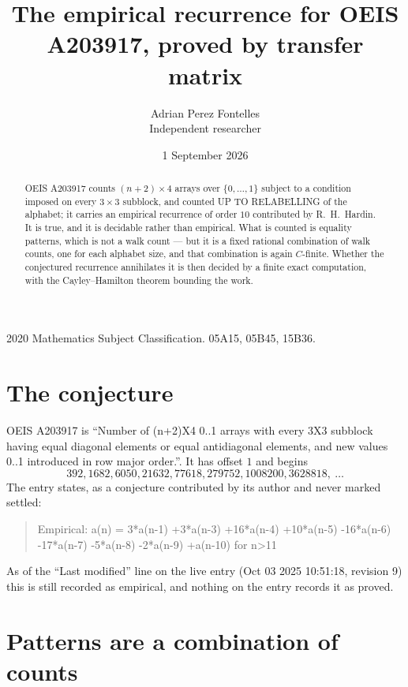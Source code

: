 \documentclass[11pt,a4paper]{article}
\title{The empirical recurrence for OEIS A203917, proved by transfer matrix}
\author{Adrian Perez Fontelles\\ \small Independent researcher}
\date{1 September 2026}
\theoremstyle{plain}
\theoremstyle{definition}
\begin{document}
\maketitle

\begin{abstract}
OEIS A203917 counts $(n+2)\times4$ arrays over $\{0,\dots,1\}$ subject to a condition imposed on
every $3\times3$ subblock, and counted UP TO RELABELLING of the
alphabet; it carries an empirical recurrence of order $10$ contributed by
R.~H.~Hardin. It is true, and it is decidable rather than empirical. What is counted is
equality patterns, which is not a walk count --- but it is a fixed rational combination of
walk counts, one for each alphabet size, and that combination is again $C$-finite. Whether the
conjectured recurrence annihilates it is then decided by a finite exact computation, with the
Cayley--Hamilton theorem bounding the work.
\end{abstract}

\noindent\small 2020 Mathematics Subject Classification. 05A15, 05B45, 15B36.\normalsize

\section{The conjecture}

OEIS A203917 is ``Number of (n+2)X4 0..1 arrays with every 3X3 subblock having equal diagonal elements or equal antidiagonal elements, and new values 0..1 introduced in row major order.''. It has offset $1$ and begins
\[
392, 1682, 6050, 21632, 77618, 279752, 1008200, 3628818,\ \dots
\]
The entry states, as a conjecture contributed by its author and never marked settled:
\begin{quote}
Empirical: a(n) = 3*a(n-1) +3*a(n-3) +16*a(n-4) +10*a(n-5) -16*a(n-6) -17*a(n-7) -5*a(n-8) -2*a(n-9) +a(n-10) for n>11
\end{quote}
As of the ``Last modified'' line on the live entry (Oct 03 2025 10:51:18, revision 9) this is still
recorded as empirical, and nothing on the entry records it as proved.

\section{Patterns are a combination of counts}
\end{document}
